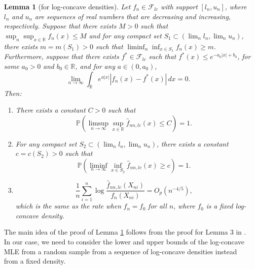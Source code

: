 \documentclass[12pt,letterpaper, twoside, openany]{article}
\theoremstyle{plain}
\newtheorem{lemma}[theorem]{Lemma}
\begin{document}
\begin{lemma}[for log-concave densities]\label{lemma:f_n*lc_UB_LB}
Let $f_n \in \mathcal{F}_{lc}$ with support $[l_n, u_n]$, where $l_n$ and $u_n$ are sequences of real numbers that are decreasing and increasing, respectively. 
Suppose that there exists $M > 0$ such that $\sup_n \sup_{x \in \mathbb{R}} f_n(x) \leq M$ and for any compact set $S_1 \subset (\lim_n l_n, \lim_n u_n)$, there exists $m=m(S_1) > 0$ such that $\liminf_n \inf_{x \in S_1} f_n(x) \geq m$. Furthermore, suppose that there exists $f^* \in \mathcal{F}_{lc}$ such that $f^*(x) \leq e^{-a_0|x| + b_0}$, for some $a_0 > 0$ and $b_0 \in \mathbb{R}$, and for any $a \in (0, a_0)$,
\begin{equation}\label{eq:exp_L1_conv}
	\lim_{n \rightarrow \infty}	\int_{\mathbb{R}} e^{a|x|}|f_n(x) - f^*(x)|\, dx = 0.
\end{equation}
Then:
\begin{enumerate}%
	\item [(a)] There exists a constant $C > 0$ such that
	\begin{equation*}
		\mathbb{P}\left ( \limsup_{n \rightarrow \infty} \sup_{x \in \mathbb{R}} \hat{f}_{nn,lc}(x) \leq C \right )  = 1.
	\end{equation*}  
	
	\item [(b)] For any compact set $S_2 \subset (\lim_n l_n, \lim_n u_n)$, there exists a constant $c = c(S_2) > 0$ such that 
	\begin{equation*}
		\mathbb{P}\left ( \liminf_{n \rightarrow \infty} \inf_{x \in S_2} \hat{f}_{nn,lc}(x) \geq c \right )  = 1.
	\end{equation*}  
	
	\item [(c)]
	\begin{equation*}
		\frac{1}{n} \sum^n_{i=1} \log \frac{ \hat{f}_{nn,lc}(X_{ni})}{f_n(X_{ni})} = O_p(n^{-4/5}),
	\end{equation*}
	which is the same as the rate when $f_n = f_0$ for all $n$, where $f_0$ is a fixed log-concave density.
\end{enumerate}
\end{lemma}

The main idea of the proof of Lemma \ref{lemma:f_n*lc_UB_LB} follows from the proof for Lemma 3 in \cite{cule2010theoretical}. In our case, we need to consider the lower and upper bounds of the log-concave MLE from a random sample from a sequence of log-concave densities instead from a fixed density.
\end{document}
